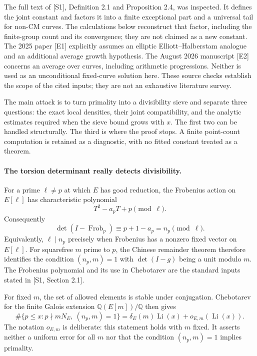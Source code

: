 \documentclass[11pt]{article}
\begin{document}
The full text of [S1], Definition 2.1 and Proposition 2.4, was inspected.
It defines the joint constant and factors it into a finite exceptional
part and a universal tail for non-CM curves. The calculations below
reconstruct that factor, including the finite-group count and its convergence;
they are not claimed as a new constant. The 2025 paper [E1] explicitly
assumes an elliptic Elliott--Halberstam analogue and an additional average
growth hypothesis. The August 2026 manuscript [E2] concerns an average
over curves, including arithmetic progressions. Neither is used as an
unconditional fixed-curve solution here. These source checks establish
the scope of the cited inputs; they are not an exhaustive literature survey.

The main attack is to turn primality into a divisibility sieve and separate
three questions: the exact local densities, their joint compatibility, and
the analytic estimates required when the sieve bound grows with $x$.
The first two can be handled structurally. The third is where the proof
stops. A finite point-count computation is retained as a diagnostic, with
no fitted constant treated as a theorem.

\paragraph{The torsion determinant really detects divisibility.}
For a prime $\ell\ne p$ at which $E$ has good reduction, the Frobenius
action on $E[\ell]$ has characteristic polynomial
\[
 T^2-a_pT+p\pmod\ell.
\]
Consequently
\begin{equation}\label{ra486:frob}
 \det(I-\operatorname{Frob}_p)\equiv p+1-a_p=n_p\pmod\ell.
\end{equation}
Equivalently, $\ell\mid n_p$ precisely when Frobenius has a nonzero fixed
vector on $E[\ell]$. For squarefree $m$ prime to $p$, the Chinese remainder
theorem therefore identifies the condition $(n_p,m)=1$ with
$\det(I-g)$ being a unit modulo $m$. The Frobenius polynomial and its use
in Chebotarev are the standard inputs stated in [S1, Section 2.1].

For fixed $m$, the set of allowed elements is stable under conjugation.
Chebotarev for the finite Galois extension $\mathbb Q(E[m])/\mathbb Q$
then gives
\begin{equation}\label{ra486:fixed}
 \#\{p\le x:p\nmid mN_E,\ (n_p,m)=1\}
 =\delta_E(m)\operatorname{Li}(x)+o_{E,m}(\operatorname{Li}(x)).
\end{equation}
The notation $o_{E,m}$ is deliberate: this statement holds with $m$ fixed.
It asserts neither a uniform error for all $m$ nor that the condition
$(n_p,m)=1$ implies primality.
\end{document}
